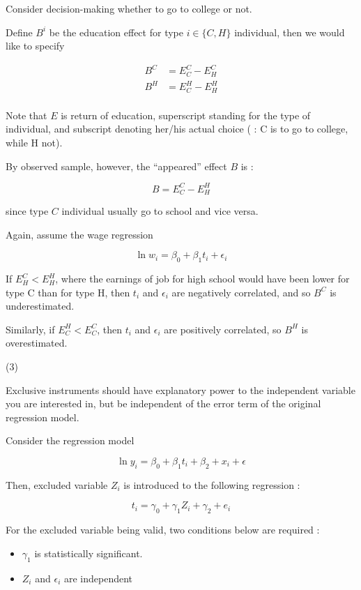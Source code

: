 \documentclass{jsarticle}
\begin{document}
\begin{enumerate}
\begin{itemize}
  Consider decision-making whether to go to college or not.
  
  Define $B^i$ be the education effect for type $i \in \{ C, H \}$ individual, then we would like to specify
  
   \begin{align*}
   B^C &= E_C^C - E_H^C \\
   B^H &= E_C^H - E_H^H \\
   \end{align*}
  
  Note that $E$ is return of education, superscript standing for the type of individual, and subscript denoting her/his actual choice ( : C is to go to college, while H not).
  
  By observed sample, however, the ``appeared'' effect $B$ is :
  
  \[ B = E_C^C - E_H^H \]
  
  since type $C$ individual usually go to school and vice versa.
  
  Again, assume the wage regression
  
  \[ \ln w_i = \beta_0 + \beta_1 t_i + \epsilon_i \]
  
  If $E_H^C < E_H^H$, where the earnings of job for high school would have been lower for type C than for type H, then $t_i$ and $\epsilon_i$ are negatively correlated, and so $B^C$ is underestimated.
  
  Similarly, if $E_C^H < E_C^C$, then $t_i$ and $\epsilon_i$ are positively correlated, so $B^H$ is overestimated.
  
  \end{itemize}
 
 (3)
 
 Exclusive instruments should have explanatory power to the independent variable you are interested in, but be independent of the error term of the original regression model.
 
 Consider the regression model
 
 \[ \ln y_i = \beta_0 + \beta_1 t_i + \beta_2 + x_i + \epsilon \]
 
 Then, excluded variable $Z_i$ is introduced to the following regression :
 
 \[t_i = \gamma_0 + \gamma_1 Z_i + \gamma_2 + e_i \]
 
 For the excluded variable being valid, two conditions below are required :
 
  \begin{itemize}
  
  \item $\gamma_1$ is statistically significant.
  
  \item $Z_i$ and $\epsilon_i$ are independent
  
  \end{itemize} 
 
 
 \end{enumerate}
\end{document}
